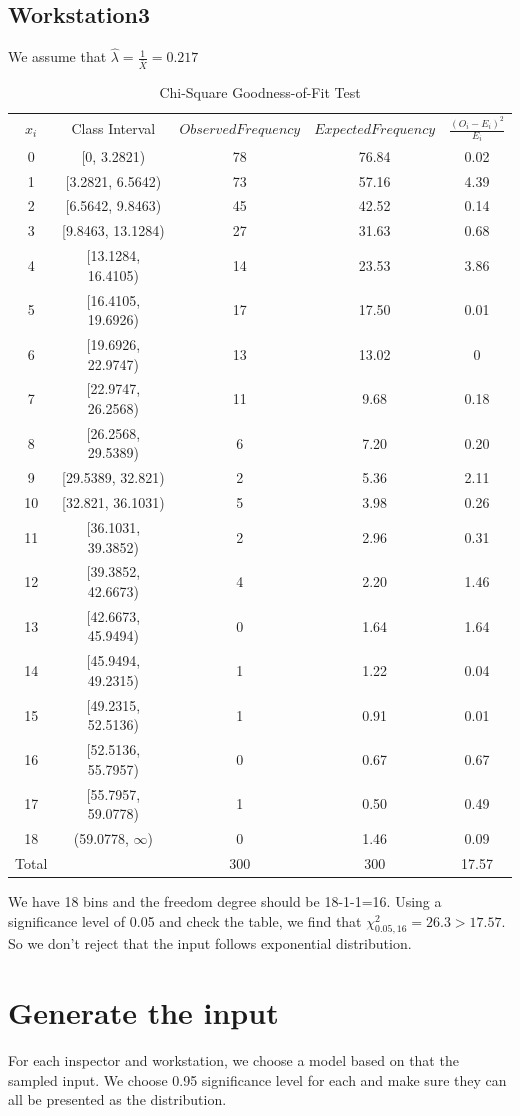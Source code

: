 \documentclass{article}
\begin{document}
\subsection{Workstation3}

We assume that $\hat{\lambda}=\frac{1}{\bar{X}}=0.217$
\begin{table}[htp]
\caption{Chi-Square Goodness-of-Fit Test}
\begin{center}
\begin{tabular}{ccccc}
\hline
$x_i$ & Class Interval & $Observed Frequency$ & $Expected Frequency$ & $\frac{(O_i-E_i)^2}{E_i}$\\
0&[0, 3.2821)&78&76.84&0.02\\
1&[3.2821, 6.5642)&73&57.16&4.39\\
2&[6.5642, 9.8463)&45&42.52&0.14\\
3&[9.8463, 13.1284)&27&31.63&0.68\\
4&[13.1284, 16.4105)&14&23.53&3.86\\
5&[16.4105, 19.6926)&17&17.50&0.01\\
6&[19.6926, 22.9747)&13&13.02&0\\
7&[22.9747, 26.2568)&11&9.68&0.18\\
8&[26.2568, 29.5389)&6&7.20&0.20\\
9&[29.5389, 32.821)&2&5.36&2.11\\
10&[32.821, 36.1031)&5&3.98&0.26\\
11&[36.1031, 39.3852)&2&2.96&0.31\\
12&[39.3852, 42.6673)&4&2.20&1.46\\
13&[42.6673, 45.9494)&0&1.64&1.64\\
14&[45.9494, 49.2315)&1&1.22&0.04\\
15&[49.2315, 52.5136)&1&0.91&0.01\\
16&[52.5136, 55.7957)&0&0.67&0.67\\
17&[55.7957, 59.0778)&1&0.50&0.49\\
18&(59.0778, $\infty$)&0&1.46&0.09\\
\hline
Total& &300&300&17.57\\

\hline

\end{tabular}
\end{center}
\label{default}
\end{table}%

We have 18 bins and the freedom degree should be 18-1-1=16. Using a significance level of 0.05 and check the table, we find that $\chi^2_{0.05, 16}=26.3 > 17.57$. So we don't reject that the input follows exponential distribution.

\section{Generate the input}

For each inspector and workstation, we choose a model based on that the sampled input. We choose 0.95 significance level for each and make sure they can all be presented as the distribution.
\end{document}
